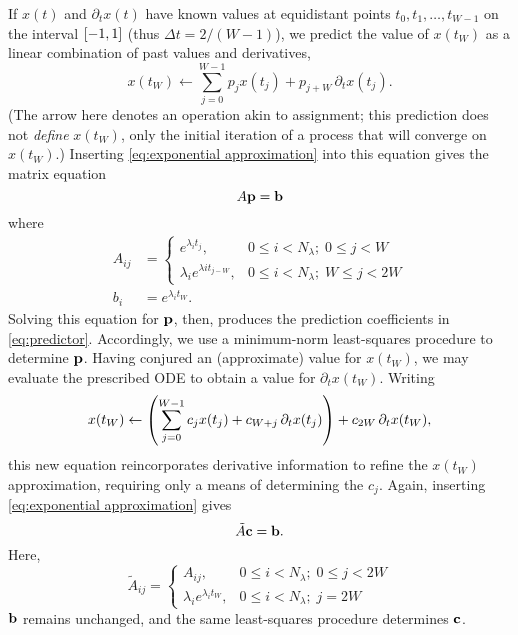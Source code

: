 If $x(t)$ and $\partial_t x(t)$ have known values at equidistant points $t_0, t_1, \ldots, t_{W - 1}$ on the interval $\qty[-1, 1]$ (thus $\Delta t = 2/(W - 1)$), we predict the value of $x(t_W)$ as a linear combination of past values and derivatives,
\begin{equation}
  x(t_W) \leftarrow \sum_{j = 0}^{W - 1} p_j x(t_j) + p_{j + W} \, \partial_t x(t_j).
  \label{eq:predictor}
\end{equation}
(The arrow here denotes an operation akin to assignment; this prediction does not \emph{define} $x(t_W)$, only the initial iteration of a process that will converge on $x(t_W)$.)
Inserting \cref{eq:exponential approximation} into this equation gives the matrix equation
\begin{equation}
  A \vb{p} = \vb{b}
  \label{eq:predictor vector}
\end{equation}
where
\begin{subequations}
\begin{align}
  A_{ij} &= \begin{cases}
    e^{\lambda_i t_j}, & 0 \leqslant i < N_\lambda; \; 0 \leqslant j < W \\
    \lambda_i e^{\lambda i t_{j - W}}, & 0 \leqslant i < N_\lambda; \; W \leqslant j < 2 W
  \end{cases} \label{eq:a matrix}\\
  b_i &= e^{\lambda_i t_W}. \label{eq:b vector}
\end{align}
\end{subequations}
Solving this equation for $\vb{p}$, then, produces the prediction coefficients in \cref{eq:predictor}.
Accordingly, we use a minimum-norm least-squares procedure to determine $\vb{p}$.
Having conjured an (approximate) value for $x(t_W)$, we may evaluate the prescribed ODE to obtain a value for $\partial_t x(t_W)$.
Writing
\begin{equation}
  x(t_W) \leftarrow \qty(\sum_{j = 0}^{W - 1} c_j x(t_j) + c_{W + j} \, \partial_t x(t_j)) + c_{2W} \, \partial_t x(t_W),
\end{equation}
this new equation reincorporates derivative information to refine the $x(t_W)$ approximation, requiring only a means of determining the $c_j$.
Again, inserting \cref{eq:exponential approximation} gives
\begin{equation}
  \tilde{A} \vb{c} = \vb{b}.
\end{equation}
Here,
\begin{equation}
  \tilde{A}_{ij} = \begin{cases}
    A_{ij}, & 0 \leqslant i < N_\lambda; \; 0 \leqslant j < 2W \\
    \lambda_i e^{\lambda_i t_W}, & 0 \leqslant i < N_\lambda; \; j = 2W
  \end{cases}
\end{equation}
$\vb{b}$ remains unchanged, and the same least-squares procedure determines $\vb{c}$.

